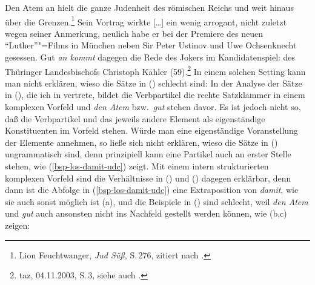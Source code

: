 \ex\label{bsp-den-atem-an-haelt-udc}
Den Atem an hielt die ganze Judenheit des römischen Reichs und weit hinaus über die Grenzen.\footnote{
        Lion Feuchtwanger, \emph{Jud Süß}, S.\,276, zitiert nach .
}
\ex Sein Vortrag wirkte [\ldots] %
ein wenig arrogant, nicht zuletzt wegen seiner Anmerkung,
neulich habe er bei der Premiere des neuen "`Luther"'"=Films in München neben
Sir Peter Ustinov und Uwe Ochsenknecht gesessen. %
Gut \emph{an kommt} dagegen die Rede des Jokers im Kandidatenspiel: des Thüringer Landesbischofs Christoph Kähler (59).\footnote{
        taz, 04.11.2003, S.\,3, siehe auch .%
}
\zl
In einem solchen Setting kann man nicht erklären, wieso die Sätze in () schlecht sind:
\eal
{}
\zl
In der Analyse der Sätze in (), die ich in  vertrete, bildet
die Verbpartikel die rechte Satzklammer in einem komplexen Vorfeld
und \emph{den Atem} bzw.\ \emph{gut} stehen davor. Es ist jedoch nicht so, daß die Verbpartikel
und das jeweils andere Element als eigenständige Konstituenten im Vorfeld stehen. Würde man eine
eigenständige Voranstellung der Elemente annehmen, so ließe sich nicht erklären, wieso die Sätze
in () ungrammatisch sind, denn prinzipiell kann eine Partikel auch an erster Stelle stehen,
wie (\ref{bsp-los-damit-udc}) zeigt. Mit einem intern strukturierten komplexen Vorfeld sind die Verhältnisse
in () und () dagegen erklärbar, denn dann ist die Abfolge in (\ref{bsp-los-damit-udc}) eine
Extraposition von \emph{damit}, wie sie auch sonst möglich ist (a), und die
Beispiele in () sind schlecht, weil \emph{den Atem} und \emph{gut} auch ansonsten nicht ins
Nachfeld gestellt werden können, wie (b,c) zeigen:
\eal
{}
\zl


